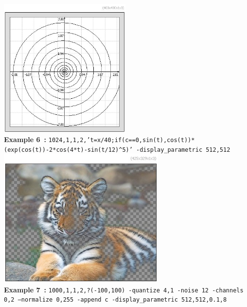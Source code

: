 \documentclass[a4paper,11pt,twoside]{book}
\begin{document}
\begin{center}\includegraphics[keepaspectratio=true,height=7cm,width=\textwidth]{img/gmic_def6.jpg}\\
{\footnotesize \textbf{Example 6~:} \texttt{1024,1,1,2,'t=x/40;if(c==0,sin(t),cos(t))*(exp(cos(t))-2*cos(4*t)-sin(t/12)\textasciicircum 5)' -display\_parametric 512,512}}
\\\includegraphics[keepaspectratio=true,height=7cm,width=\textwidth]{img/gmic_def7.jpg}\\
{\footnotesize \textbf{Example 7~:} \texttt{1000,1,1,2,?(-100,100) -quantize 4,1 -noise 12 -channels 0,2 --normalize 0,255 -append c -display\_parametric 512,512,0.1,8}}
\end{center}
\end{document}
